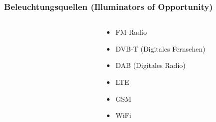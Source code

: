 \begin{frame}
    \frametitle{Beleuchtungsquellen (Illuminators of Opportunity)}

    \begin{columns}
        \begin{column}{0.2\textwidth}
            \begin{figure}
                \raggedleft{}
            \end{figure}
        \end{column}
        \begin{column}{0.8\textwidth}
            \begin{itemize}
                \item FM-Radio
                \item DVB-T (Digitales Fernsehen)
                \item DAB (Digitales Radio)
                \item LTE
                \item GSM
                \item WiFi
            \end{itemize}
        \end{column}
    \end{columns}
\end{frame}

